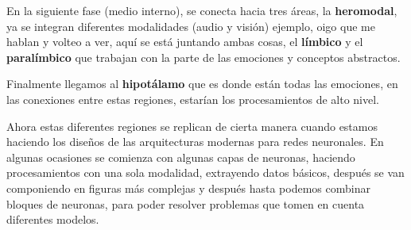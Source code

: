 En la siguiente fase (medio interno), se conecta hacia tres áreas, la \textbf{heromodal}, ya se integran diferentes modalidades (audio y visión) ejemplo, oigo que me hablan y volteo a ver, aquí se está juntando ambas cosas, el \textbf{límbico} y el \textbf{paralímbico} que trabajan con la parte de las emociones y conceptos abstractos.

Finalmente llegamos al \textbf{hipotálamo} que es donde están todas las emociones, en las conexiones entre estas regiones, estarían los procesamientos de alto nivel.

Ahora estas diferentes regiones se replican de cierta manera cuando estamos haciendo los diseños de las arquitecturas modernas para redes neuronales.
En algunas ocasiones se comienza con algunas capas de neuronas, haciendo procesamientos con una sola modalidad, extrayendo datos básicos, después se van
componiendo en figuras más complejas y después hasta podemos combinar bloques de neuronas, para poder resolver problemas que tomen en cuenta diferentes modelos.



